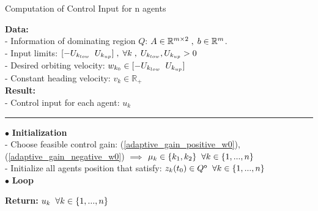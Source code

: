 \begin{algorithm} [H] %
	\caption{Computation of Control Input for n agents} %
	\label{alg1} %
	\textbf{Data:}\\
	- Information of dominating region ${Q}$: ${A \in \mathbb{R}^{m \times 2} \txtspc{,} b \in \mathbb{R}^m }$. \\
	- Input limits: ${[-U_{k_{low}} \txtspc{ } U_{k_{up}}] \txtspc{,} \forall k \txtspc{,} U_{k_{low}},U_{k_{up}} > 0}$ \\
	- Desired orbiting velocity: ${w_{k_0} \in [-U_{k_{low}} \txtspc{ } U_{k_{up}}]}$ \\
	- Constant heading velocity: ${v_k \in \mathbb{R}_+}$ \\
	\textbf{Result:} \\
	- Control input for each agent: ${u_k}$ \\
	\noindent\rule{\textwidth}{1pt}

	$\bullet$ \textbf{Initialization} \\%
	- Choose feasible control gain: (\ref{adaptive_gain_positive_w0}),(\ref{adaptive_gain_negative_w0}) ${\implies}$  ${\mu_k \in \{k_1,k_2\} \txtspc{ } \forall{k} \in \{1,...,n\}}$ \\
	- Initialize all agents position that satisfy: ${z_k(t_0) \in \interior{Q} \txtspc{ } \forall{k} \in \{1,...,n\}}$ \\
	
	$\bullet$ \textbf{Loop}%
	\begin{algorithmic} %
		\STATE { } 
		\STATE { } 
		\ELSE 
		\ENDIF
		\STATE { } 

		\STATE { } 
		
	
		\ELSE 
		\ENDIF
		
		\STATE { } 

	\ENDFOR	
	\end{algorithmic} %
	\textbf{Return:} ${u_k \txtspc{ } \forall k \in \{1,...,n\}}$\\
\end{algorithm}




